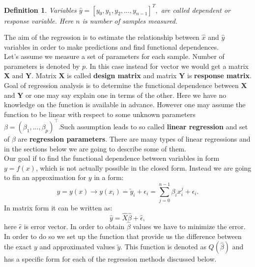 \documentclass[10pt]{article}
\newtheorem{defn}{Definition}
\begin{document}
\begin{defn}
	Variables  $\hat{y} = [y_0,y_1, y_2,\dots, y_{n-1}]^T,$ are called dependent or response variable. Here $n$ is number of samples measured.
\end{defn}
The aim of the regression is to estimate the relationship between $\hat{x}$ and $\hat{y}$ variables in order to make predictions and find functional dependences. \\
Let's assume we measure a set of parameters for each sample. Number of parameters is denoted by $p$. In this case instead for vector we would get a matrix $\textbf{X}$ and $\textbf{Y}$. Matrix $\textbf{X}$ is called \textbf{design matrix} and matrix $\textbf{Y}$ is \textbf{response matrix}. Goal of regression analysis is to determine the functional dependence between $\textbf{X}$ and $\textbf{Y}$ or one may say explain one in terms of the other. Here we have no knowledge on the function is available in advance. However one may assume the function to be linear with respect to some unknown parameters $\beta = (\beta_1, \ldots, \beta_p)^{\top}$.Such assumption leads to so called \textbf{linear regression} and set of $\beta$  are \textbf{regression parameters}. There are many types of linear regressions and in the sections below we are going to describe some of them.\\
Our goal if to find the functional dependence between variables in form $y=f(x)$, which is not actually possible in the closed form. Instead we are going to fin an approximation for $y$ in a form:
\begin{equation}
y=y(x) \rightarrow y(x_i)=\tilde{y}_i+\epsilon_i=\sum_{j=0}^{n-1} \beta_i x_i^j+\epsilon_i.
\end{equation}
In matrix form it can be written as:
\begin{equation}
\hat{y} = \hat{X}\hat{\beta}+\hat{\epsilon},
\end{equation}
here $\hat{\epsilon}$ is error vector.
In order to obtain $\hat{\beta}$ values we have to minimize the error.
In order to do so we set up the function that provide us the difference between the exact $y$ and approximated values $\tilde{y}$. This function is denoted as $Q(\hat{\beta})$ and has a specific form for each of the regression methods discussed below.
\end{document}
